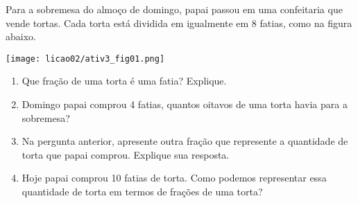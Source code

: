 \begin{atividade}{}\label{chap2-ativ4}

Para a sobremesa do almoço de domingo, papai passou em uma confeitaria que vende tortas.
Cada torta está dividida em  igualmente em 8 fatias, como na figura abaixo.

\begin{center}
\texttt{[image: licao02/ativ3\_fig01.png]}
\end{center}

\begin{enumerate}  %
  \item     Que fração de uma torta é uma fatia? Explique.
  \item     Domingo papai comprou 4 fatias, quantos oitavos de uma torta havia para a sobremesa?
  \item     Na pergunta anterior, apresente outra fração que represente a quantidade de torta que papai comprou. Explique sua resposta.
  \item     Hoje papai comprou 10 fatias de torta. Como podemos representar essa quantidade de torta em termos de frações de uma torta?
\end{enumerate} %
\end{atividade}

